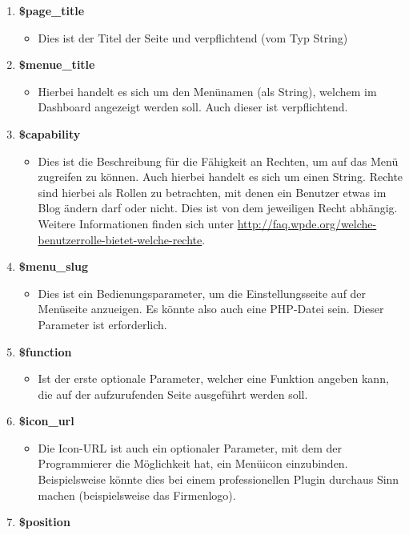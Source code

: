 \begin{enumerate}
	\item \textbf{\$page\_title}
	\begin{itemize}
		\item Dies ist der Titel der Seite und verpflichtend  (vom Typ String)
	\end{itemize}
	\item \textbf{\$menue\_title}
		\begin{itemize}
		\item Hierbei handelt es sich um den Menünamen (als String), welchem im Dashboard angezeigt werden soll. Auch dieser ist verpflichtend.
	\end{itemize}
	\item \textbf{\$capability}
	\begin{itemize}
		\item Dies ist die Beschreibung für die Fähigkeit an Rechten, um auf das Menü zugreifen zu können. Auch hierbei handelt es sich um einen String. Rechte sind hierbei als Rollen zu betrachten, mit denen ein Benutzer etwas im Blog ändern darf oder nicht. Dies ist von dem jeweiligen Recht abhängig. Weitere Informationen finden sich unter \url{http://faq.wpde.org/welche-benutzerrolle-bietet-welche-rechte}.
	\end{itemize}
	\item \textbf{\$menu\_slug}
	\begin{itemize}
		\item  Dies ist ein Bedienungsparameter, um die Einstellungsseite auf der Menüseite anzueigen. Es könnte also auch eine PHP-Datei sein. Dieser Parameter ist erforderlich.
	\end{itemize}
	\item \textbf{\$function}
	\begin{itemize}
		\item Ist der erste optionale Parameter, welcher eine Funktion angeben kann, die auf der aufzurufenden Seite ausgeführt werden soll.
	\end{itemize}
	\item \textbf{\$icon\_url}
	\begin{itemize}
		\item Die Icon-URL ist auch ein optionaler Parameter, mit dem der Programmierer die Möglichkeit hat, ein Menüicon einzubinden. Beispielsweise könnte dies bei einem professionellen Plugin durchaus Sinn machen (beispielsweise das Firmenlogo).
	\end{itemize}
	\item \textbf{\$position}

\end{enumerate}
